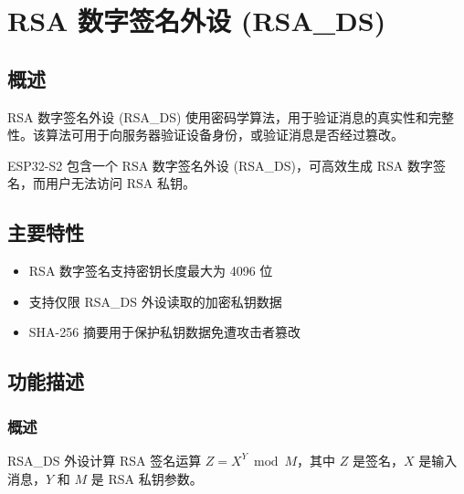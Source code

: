 \documentclass[main\_\_CN.tex]{subfiles}
\begin{document}

\ifglobal
\else
    {\let\clearpage\relax \listoftodos}
    {\let\clearpage\relax \listofdonetodos}
    \tableofcontents
\fi


\chapter{RSA 数字签名外设 (RSA\_DS)}
\label{mod:digsig}
\hypertarget{digsig}{}\hypertarget{rsads}{}


\section{概述}

RSA 数字签名外设 (RSA\_DS) 使用密码学算法，用于验证消息的真实性和完整性。该算法可用于向服务器验证设备身份，或验证消息是否经过篡改。

ESP32-S2 包含一个 RSA 数字签名外设 (RSA\_DS)，可高效生成 RSA 数字签名，而用户无法访问 RSA 私钥。

\section{主要特性}

\begin{itemize}
\item RSA 数字签名支持密钥长度最大为 4096 位
\item 支持仅限 RSA\_DS 外设读取的加密私钥数据
\item SHA-256 摘要用于保护私钥数据免遭攻击者篡改
\end{itemize}


\section{功能描述}
\subsection{概述}

RSA\_DS 外设计算 RSA 签名运算 \begin{math}Z = X^{Y} \bmod M\end{math}，其中 \begin{math}Z\end{math} 是签名，\begin{math}X\end{math} 是输入消息，\begin{math}Y\end{math} 和 \begin{math}M\end{math} 是 RSA 私钥参数。
\end{document}
